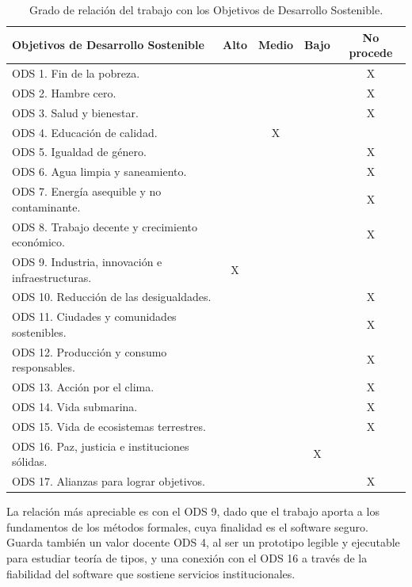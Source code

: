 \begin{table}[h]
  \centering
  \renewcommand{\arraystretch}{1.3}
  \begin{tabular}{|l|c|c|c|c|}
    \hline
    \textbf{Objetivos de Desarrollo Sostenible} & \textbf{Alto} & \textbf{Medio} & \textbf{Bajo} & \textbf{No procede} \\
    \hline
    ODS 1. Fin de la pobreza.                        &   &   &   & X \\ \hline
    ODS 2. Hambre cero.                              &   &   &   & X \\ \hline
    ODS 3. Salud y bienestar.                        &   &   &   & X \\ \hline
    ODS 4. Educación de calidad.                     &   & X &   &   \\ \hline
    ODS 5. Igualdad de género.                       &   &   &   & X \\ \hline
    ODS 6. Agua limpia y saneamiento.                &   &   &   & X \\ \hline
    ODS 7. Energía asequible y no contaminante.      &   &   &   & X \\ \hline
    ODS 8. Trabajo decente y crecimiento económico.  &   &   &   & X \\ \hline
    ODS 9. Industria, innovación e infraestructuras. & X &   &   &   \\ \hline
    ODS 10. Reducción de las desigualdades.          &   &   &   & X \\ \hline
    ODS 11. Ciudades y comunidades sostenibles.      &   &   &   & X \\ \hline
    ODS 12. Producción y consumo responsables.       &   &   &   & X \\ \hline
    ODS 13. Acción por el clima.                     &   &   &   & X \\ \hline
    ODS 14. Vida submarina.                          &   &   &   & X \\ \hline
    ODS 15. Vida de ecosistemas terrestres.          &   &   &   & X \\ \hline
    ODS 16. Paz, justicia e instituciones sólidas.   &   &   & X &   \\ \hline
    ODS 17. Alianzas para lograr objetivos.          &   &   &   & X \\ \hline
  \end{tabular}
  \caption{Grado de relación del trabajo con los Objetivos de Desarrollo Sostenible.}
  \label{tab:ods}
\end{table}

\indent La relación más apreciable es con el ODS 9, dado que el trabajo aporta a los
fundamentos de los métodos formales, cuya finalidad es el software seguro. Guarda
también un valor docente ODS 4, al ser un prototipo legible y ejecutable
para estudiar teoría de tipos, y una conexión con el ODS 16 a través
de la fiabilidad del software que sostiene servicios institucionales.


